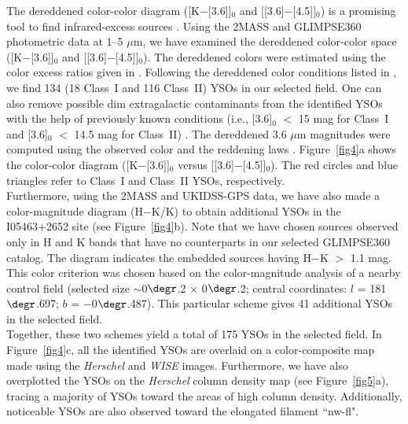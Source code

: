\documentclass[iop]{emulateapj}
\begin{document}
The dereddened color-color diagram ([K$-$[3.6]]$_{0}$ and [[3.6]$-$[4.5]]$_{0}$) is a promising tool to find infrared-excess sources \citep[e.g.][]{gutermuth09}. 
Using the 2MASS and GLIMPSE360 photometric data at 1--5 $\mu$m, we have examined the dereddened color-color space ([K$-$[3.6]]$_{0}$ and [[3.6]$-$[4.5]]$_{0}$). The dereddened colors were estimated using the color excess ratios given in \citet{flaherty07}. 
Following the dereddened color conditions listed in \citet{gutermuth09}, we find 134 (18 Class~I and 116 Class~II) YSOs in our selected field. 
One can also remove possible dim extragalactic contaminants from the identified YSOs with the help of previously known conditions (i.e., [3.6]$_{0}$ $<$ 15 mag for Class~I and [3.6]$_{0}$ $<$ 14.5 mag for Class~II) \citep[e.g.,][]{gutermuth09}.  
The dereddened 3.6 $\mu$m magnitudes were computed using the observed color and the reddening laws \citep[from][]{flaherty07}.
Figure~\ref{fig4}a shows the color-color diagram ([K$-$[3.6]]$_{0}$ versus [[3.6]$-$[4.5]]$_{0}$).  
The red circles and blue triangles refer to Class~I and Class~II YSOs, respectively.\\  
Furthermore, using the 2MASS and UKIDSS-GPS data, we have also made a color-magnitude diagram (H$-$K/K) to obtain additional YSOs in the I05463+2652 site 
(see Figure~\ref{fig4}b). Note that we have chosen sources observed only in H and K bands that have no counterparts in our selected GLIMPSE360 catalog. 
The diagram indicates the embedded sources having H$-$K $>$ 1.1 mag. 
This color criterion was chosen based on the color-magnitude analysis of a nearby control field (selected size $\sim$0$\degr$.2 
$\times$ 0$\degr$.2; central coordinates: $l$ = 181$\degr$.697; $b$ = $-$0$\degr$.487). 
This particular scheme gives 41 additional YSOs in the selected field.\\ 

Together, these two schemes yield a total of 175 YSOs in the selected field. 
In Figure~\ref{fig4}c, all the identified YSOs are overlaid on a color-composite map made using the {\it Herschel} and {\it WISE} images.
Furthermore, we have also overplotted the YSOs on the {\it Herschel} column density map (see Figure~\ref{fig5}a), tracing 
a majority of YSOs toward the areas of high column density. 
Additionally, noticeable YSOs are also observed toward the elongated filament ``nw-fl".
%
\end{document}
